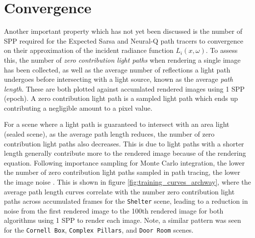 \documentclass[../dissertation.tex]{subfiles}
\begin{document}
\section{Convergence}
\label{sec:convergence_learning_incident}

Another important property which has not yet been discussed is the number of SPP required for the Expected Sarsa and Neural-Q path tracers to convergence on their approximation of the incident radiance function $L_i(x, \omega)$. To assess this, the number of \textit{zero contribution light paths} when rendering a single image has been collected, as well as the average number of reflections a light path undergoes before intersecting with a light source, known as the average \textit{path length}. These are both plotted against accumlated rendered images using 1 SPP (epoch). A zero contribution light path is a sampled light path which ends up contributing a negligible amount to a pixel value.

For a scene where a light path is guaranteed to intersect with an area light (sealed scene), as the average path length reduces, the number of zero contribution light paths also decreases. This is due to light paths with a shorter length generally contribute more to the rendered image because of the rendering equation. Following importance sampling for Monte Carlo integration, the lower the number of zero contribution light paths sampled in path tracing, the lower the image noise \cite{dahm2017learning}.  This is shown in figure \ref{fig:training_curves_archway}, where the average path length curves correlate with the number zero contribution light paths across accumulated frames for the \verb|Shelter| scene, leading to a reduction in noise from the first rendered image to the 100th rendered image for both algorithms using 1 SPP to render each image. Note, a similar pattern was seen for the \verb|Cornell Box|, \verb|Complex Pillars|, and \verb|Door Room| scenes.
\end{document}
